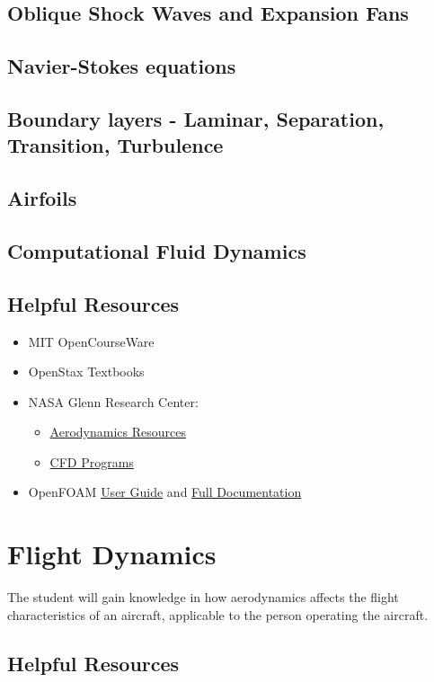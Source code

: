 \documentclass[12pt]{article}
\begin{document}
	\subsection{Oblique Shock Waves and Expansion Fans}
	\subsection{Navier-Stokes equations}
	\subsection{Boundary layers - Laminar, Separation, Transition, Turbulence}
	\subsection{Airfoils}
	\subsection{Computational Fluid Dynamics}
	\subsection{Helpful Resources}
		\begin{itemize}
			\item MIT OpenCourseWare
			\item OpenStax Textbooks
			\item NASA Glenn Research Center: 
			\begin{itemize}
				\item \href{https://www.grc.nasa.gov/www/k-12/airplane/short.html}{Aerodynamics Resources}
				\item \href{https://www.grc.nasa.gov/www/k-12/UndergradProgs/index.htm}{CFD Programs}
			\end{itemize}
			\item OpenFOAM \href{https://cfd.direct/openfoam/user-guide/}{User Guide} and \href{https://cfd.direct/openfoam/documentation/}{Full Documentation}
		\end{itemize}
\section{Flight Dynamics}
The student will gain knowledge in how aerodynamics affects the flight characteristics of an aircraft, applicable to the person operating the aircraft. 
		\subsection{Helpful Resources}
\end{document}
